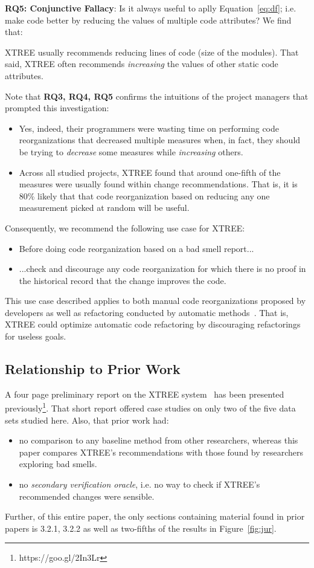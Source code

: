 \documentclass[twocolumn,5p]{elsarticle}
\newcommand{\bi}{\begin{itemize}[leftmargin=0.4cm]}
\newcommand{\ei}{\end{itemize}}
\newcommand{\fig}[1]{Figure~\ref{fig:#1}}
\newcommand{\eq}[1]{Equation~\ref{eq:#1}}
\theoremstyle{break}
\begin{document}
	{\bf RQ5: Conjunctive Fallacy}:  
	Is it always  useful  to aplly \eq{df}; i.e. make code better by   reducing the values of  multiple code attributes? We find that:
	\begin{lesson}
		XTREE usually recommends reducing lines of code (size of the modules).
		That said,  XTREE often recommends {\em increasing} the values of other static code attributes.
	\end{lesson} 
	Note that {\bf RQ3, RQ4, RQ5} 
	confirms the intuitions
	of the project managers that prompted this investigation:
	\bi
	\item
	Yes,  indeed, their programmers
	were wasting time on   performing code reorganizations  that  decreased multiple measures when, in fact,
	they should be trying to {\em decrease} some measures while {\em increasing} others.
	\item
	Across all studied projects, XTREE found that  around one-fifth  
	of the measures were usually found within  change recommendations. That is, it is 80\% likely that
	that code reorganization based on reducing any one measurement picked at random will be useful.
	\ei
	Consequently, we  recommend the following use case for  XTREE:
	\bi
	\item Before doing  code reorganization based on a bad smell report...
	\item ...check and discourage any code reorganization   for which there is no proof
	in the historical record that the change improves the code.
	\ei
	This use case described  applies to both manual code reorganizations proposed by developers
	as well as refactoring conducted by automatic methods~\cite{mkaouer2015many}. That is, XTREE could optimize automatic
	code refactoring by discouraging refactorings for useless goals.
	
	
	
	\subsection{Relationship to Prior Work }
	A four page preliminary report on the XTREE system~\cite{krishna2015actionable} has been presented previously\footnote{https://goo.gl/2In3Lr}. That short report offered case studies on only two  of
	the five data sets studied here. Also, that prior work had:
	\bi
	\item
	no comparison to any baseline
	method from other researchers, whereas this paper compares XTREE's recommendations
	with those found by researchers exploring bad smells.
	\item
	no {\em secondary verification oracle}, i.e. no way to check if XTREE's recommended changes were sensible.
	\ei
	Further, of this entire paper, the only sections containing material
	found in prior papers is 3.2.1, 3.2.2 as well as two-fifths of the results in \fig{jur}. 
	
\end{document}
